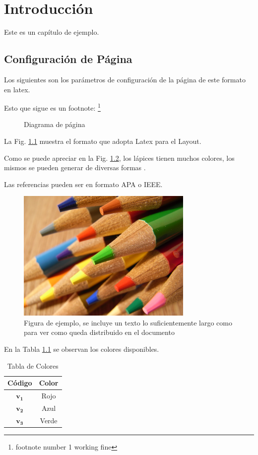 \chapter{Introducción} \label{intro}
Este es un capítulo de ejemplo.
\section{Configuración de Página}
Los siguientes son los parámetros de configuración de la página de este formato en latex.
\pagevalues

Esto que sigue es un footnote: \footnote{footnote number 1 working fine}
%
\begin{figure}
	\pagediagram
	\caption{Diagrama de página}
	\label{fig1_intro}
\end{figure}

La Fig. \ref{fig1_intro} muestra el formato que adopta Latex para el Layout.

Como se puede apreciar en la Fig. \ref{fig2_intro}, los lápices tienen muchos colores, los mismos se pueden generar de diversas formas \cite{ejemplo}.

Las referencias pueden ser en formato APA o IEEE.

\begin{figure}[htb]
	\centering
	\includegraphics[width=8.5cm]{figs/chapter1/sample.jpg}
	\caption[Figura de ejemplo]{Figura de ejemplo, se incluye un texto lo suficientemente largo como para ver como queda distribuido en el documento}
	\label{fig2_intro}
\end{figure}

\lipsum[15-18]

En la Tabla \ref{table1_intro} se observan los colores disponibles.
\begin{table}[htb]
\renewcommand{\arraystretch}{1.3}
	\caption{Tabla de Colores}
	\label{table1_intro}
	\centering
	\setlength\tabcolsep{2pt}
	\begin{tabular}{c c}
		\hline
		\bfseries Código & \bfseries Color\\
		\hline
		$\mathbf{v_1}$ & Rojo\\
		$\mathbf{v_2}$ & Azul\\
		$\mathbf{v_3}$ & Verde\\
		\hline
	\end{tabular}
\end{table}

